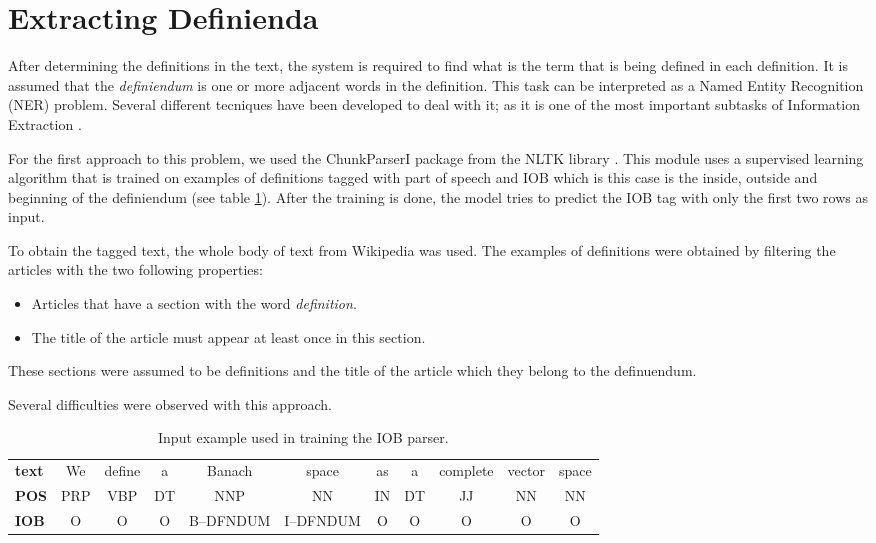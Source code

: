 \documentclass[a4paper]{easychair}
\begin{document}
\section{Extracting Definienda}
After determining the definitions in the text, the system is required to find what is the term that is being defined in each definition. It is assumed that the  \emph{definiendum} is one or more adjacent words in the definition. This task can be interpreted as a Named Entity Recognition (NER) problem. Several different tecniques have been developed to deal with it;  as it is one of the most important subtasks of Information Extraction \cite{nersurvey}.

 For the first approach to this problem, we used the ChunkParserI package from the NLTK library \cite{nltk}. This module uses a supervised learning algorithm that is trained on examples of definitions tagged with  part of speech and IOB which is this case is the inside, outside and beginning of the definiendum (see table \ref{iobtags}). After the training  is done, the model tries to predict the IOB tag with only the first two rows as input.

To obtain the tagged text, the whole body of text from Wikipedia was used. The examples of definitions were obtained by filtering the articles with the two following properties:
\begin{itemize}
    \item Articles that have a section with the word \textit{definition}.
    \item The title of the article must appear at least once in this section.
\end{itemize}
These sections were assumed to be definitions and the title of the article which they belong to the definuendum. 

Several difficulties were observed with this approach. 
\begin{table}[h]
    \begin{center}
        {\scriptsize
        \begin{tabular}{lcccccccccc}
        \hline
            \textbf{text} &We & define & a & Banach & space & as & a & complete & vector & space \\
            \textbf{POS}&PRP & VBP & DT & NNP & NN & IN & DT & JJ & NN & NN\\
            \textbf{IOB} & O& O& O& B--DFNDUM & I--DFNDUM & O& O& O& O& O \\
         \hline
    \end{tabular}
        \caption{\label{iobtags} Input example used in  training the IOB parser.}}
    \end{center} 
\end{table}
 


\end{document}
